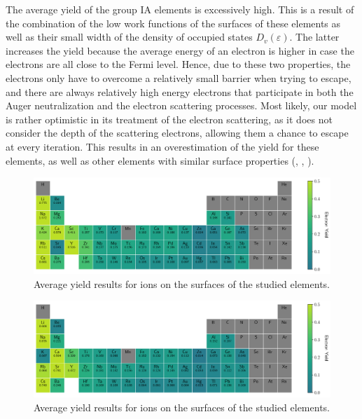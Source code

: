 \begin{refsection}
The average yield of the group IA elements is excessively high. This is a 
result of the combination of the low work functions of the surfaces of these 
elements as well as their small width of the density of occupied states 
$D_v(\varepsilon)$. The latter increases the yield because the average energy 
of an electron is higher in case the electrons are all close to the Fermi 
level. Hence, due to these two properties, the electrons only have 
to overcome a relatively small barrier when trying to escape, and there are 
always relatively high energy electrons that participate in both the Auger 
neutralization and the electron scattering processes. Most likely, our model 
is rather optimistic in its treatment of the electron scattering, as it does 
not consider the depth of the scattering electrons, allowing them a chance 
to escape at every iteration. This results in 
an overestimation of the yield for these elements, as well as other elements 
with similar surface properties (, , ). 
  
\begin{figure}[ht] 
\centering 
\captionsetup{width=0.9\textwidth}
\includegraphics[width=\textwidth]{figures/quotas/He_yield_table.png} 
\caption{Average yield results for  ions on the surfaces of the 
studied elements.} 
\label{quotas:fig-He_yield_table} 
\end{figure} 

\begin{figure}[ht] 
\centering 
\captionsetup{width=0.9\textwidth}
\includegraphics[width=\textwidth]{figures/quotas/Ne_yield_table.png} 
\caption{Average yield results for  ions on the surfaces of the 
studied elements.} 
\label{quotas:fig-Ne_yield_table} 
\end{figure} 


\end{refsection}
